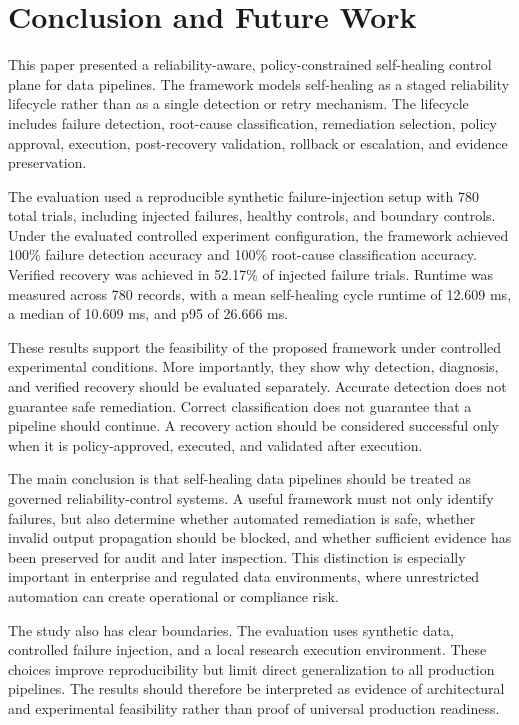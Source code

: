 \section{Conclusion and Future Work}
\label{sec:conclusion}

This paper presented a reliability-aware, policy-constrained self-healing control plane for data pipelines. The framework models self-healing as a staged reliability lifecycle rather than as a single detection or retry mechanism. The lifecycle includes failure detection, root-cause classification, remediation selection, policy approval, execution, post-recovery validation, rollback or escalation, and evidence preservation.

The evaluation used a reproducible synthetic failure-injection setup with 780 total trials, including injected failures, healthy controls, and boundary controls. Under the evaluated controlled experiment configuration, the framework achieved 100\% failure detection accuracy and 100\% root-cause classification accuracy. Verified recovery was achieved in 52.17\% of injected failure trials. Runtime was measured across 780 records, with a mean self-healing cycle runtime of 12.609 ms, a median of 10.609 ms, and p95 of 26.666 ms.

These results support the feasibility of the proposed framework under controlled experimental conditions. More importantly, they show why detection, diagnosis, and verified recovery should be evaluated separately. Accurate detection does not guarantee safe remediation. Correct classification does not guarantee that a pipeline should continue. A recovery action should be considered successful only when it is policy-approved, executed, and validated after execution.

The main conclusion is that self-healing data pipelines should be treated as governed reliability-control systems. A useful framework must not only identify failures, but also determine whether automated remediation is safe, whether invalid output propagation should be blocked, and whether sufficient evidence has been preserved for audit and later inspection. This distinction is especially important in enterprise and regulated data environments, where unrestricted automation can create operational or compliance risk.

The study also has clear boundaries. The evaluation uses synthetic data, controlled failure injection, and a local research execution environment. These choices improve reproducibility but limit direct generalization to all production pipelines. The results should therefore be interpreted as evidence of architectural and experimental feasibility rather than proof of universal production readiness.

